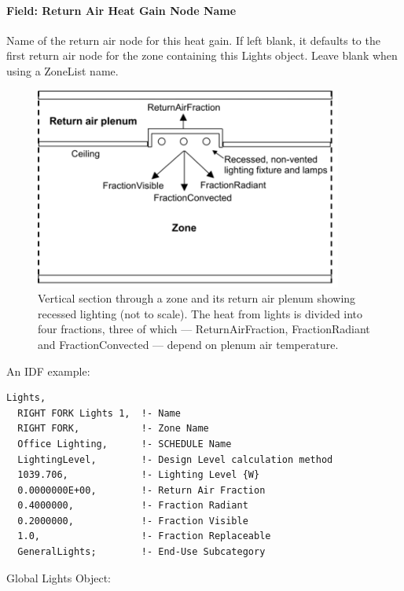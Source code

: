 \paragraph{Field: Return Air Heat Gain Node Name}\label{field-return-air-heat-gain-node-name}

Name of the return air node for this heat gain. If left blank, it defaults to the first return air node for the zone containing this Lights object. Leave blank when using a ZoneList name.

\begin{figure}[hbtp] %
\centering
\includegraphics[width=0.9\textwidth, height=0.9\textheight, keepaspectratio=true]{media/image087.png}
\caption{Vertical section through a zone and its return air plenum showing recessed lighting (not to scale). The heat from lights is divided into four fractions, three of which --- ReturnAirFraction, FractionRadiant and FractionConvected --- depend on plenum air temperature. \protect \label{fig:vertical-section-through-a-zone-and-its}}
\end{figure}

An IDF example:

\begin{lstlisting}
Lights,
  RIGHT FORK Lights 1,  !- Name
  RIGHT FORK,           !- Zone Name
  Office Lighting,      !- SCHEDULE Name
  LightingLevel,        !- Design Level calculation method
  1039.706,             !- Lighting Level {W}
  0.0000000E+00,        !- Return Air Fraction
  0.4000000,            !- Fraction Radiant
  0.2000000,            !- Fraction Visible
  1.0,                  !- Fraction Replaceable
  GeneralLights;        !- End-Use Subcategory
\end{lstlisting}

Global Lights Object:

